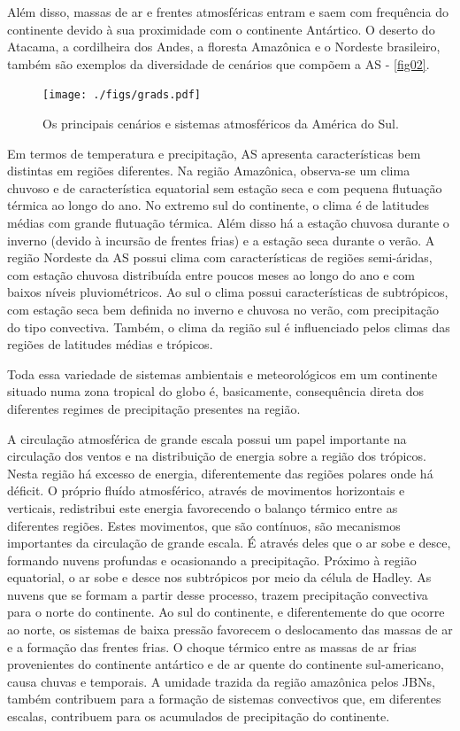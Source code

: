 Além disso, massas de ar e frentes atmosféricas entram e saem com frequência do continente devido à sua proximidade com o continente Antártico. O deserto do Atacama, a cordilheira dos Andes, a floresta Amazônica e o Nordeste brasileiro, também são exemplos da diversidade de cenários que compõem a AS - \autoref{fig02}.

\begin{figure}[!hbp]
\centering
\texttt{[image: ./figs/grads.pdf]}
\caption{Os principais cenários e sistemas atmosféricos da América do Sul.}
\label{fig02}
\end{figure}

Em termos de temperatura e precipitação, AS apresenta características bem distintas em regiões diferentes. Na região Amazônica, observa-se um clima chuvoso e de característica equatorial sem estação seca e com pequena flutuação térmica ao longo do ano. No extremo sul do continente, o clima é de latitudes médias com grande flutuação térmica. Além disso há a estação chuvosa durante o inverno (\-de\-vi\-do à incursão de frentes frias) e a estação seca durante o verão. A região Nordeste da AS possui clima com características de regiões semi-áridas, com estação chuvosa distribuída entre poucos meses ao longo do ano e com baixos níveis pluviométricos. Ao sul o clima possui características de subtrópicos, com estação seca bem definida no inverno e chuvosa no verão, com precipitação do tipo convectiva. Também, o clima da região sul é influenciado pelos climas das regiões de latitudes médias e trópicos.

Toda essa variedade de sistemas ambientais e meteorológicos em um continente situado numa zona tropical do globo é, basicamente, consequência direta dos diferentes regimes de precipitação presentes na região. 

A circulação atmosférica de grande escala possui um papel importante na circulação dos ventos e na distribuição de energia sobre a região dos trópicos. Nesta região há excesso de energia, diferentemente das regiões polares onde há déficit. O próprio fluído atmosférico, através de movimentos horizontais e verticais, redistribui este energia favorecendo o balanço térmico entre as diferentes regiões. Estes movimentos, que são contínuos, são mecanismos importantes da circulação de grande escala. É através deles que o ar sobe e desce, formando nuvens profundas e ocasionando a precipitação. Próximo à região equatorial, o ar sobe e desce nos subtrópicos por meio da célula de Hadley. As nuvens que se formam a partir desse processo, trazem precipitação convectiva para o norte do continente. Ao sul do continente, e diferentemente do que ocorre ao norte, os sistemas de baixa pressão favorecem o deslocamento das massas de ar e a formação das frentes frias. O choque térmico entre as massas de ar frias provenientes do continente antártico e de ar quente do continente sul-americano, causa chuvas e temporais. A umidade trazida da região amazônica pelos JBNs, também contribuem para a formação de sistemas convectivos que, em diferentes escalas, contribuem para os acumulados de precipitação do continente.

